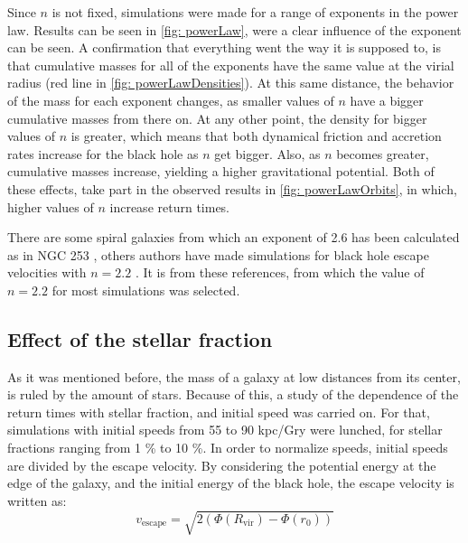 		Since $n$ is not fixed, simulations were made for a range of exponents in the power law. Results can be seen in \autoref{fig: powerLaw}, were a clear influence of the exponent can be seen. A confirmation that everything went the way it is supposed to, is that cumulative masses for all of the exponents have the same value at the virial radius (red line in \autoref{fig: powerLawDensities}). At this same distance, the behavior of the mass for each exponent changes, as smaller values of $n$ have a bigger cumulative masses from there on. At any other point, the density for bigger values of $n$ is greater, which means that both dynamical friction and accretion rates increase for the black hole as $n$ get bigger. Also, as $n$ becomes greater, cumulative masses increase, yielding a higher gravitational potential. Both of these effects, take part in the observed results in \autoref{fig: powerLawOrbits}, in which, higher values of $n$ increase return times.
		
		There are some spiral galaxies from which an exponent of 2.6 has been calculated as in NGC 253 \cite{sorai2000distribution}, others authors have made simulations for black hole escape velocities with $n = 2.2$ \cite{tanaka2009assembly, choksi2017recoiling}. It is from these references, from which the value of $n = 2.2$ for most simulations was selected.
		
	\subsection{Effect of the stellar fraction}
		As it was mentioned before, the mass of a galaxy at low distances from its center, is ruled by the amount of stars. Because of this, a study of the dependence of the return times with stellar fraction, and initial speed was carried on. For that, simulations with initial speeds from 55 to 90 kpc/Gry were lunched, for stellar fractions ranging from 1 \% to 10 \%. In order to normalize speeds, initial speeds are divided by the escape velocity. By considering the potential energy at the edge of the galaxy, and the initial energy of the black hole, the escape velocity is written as:
		\begin{equation}
			v_\text{escape} = \sqrt{2 \left(\Phi(R_\text{vir}) - \Phi(r_0)\right)}
		\end{equation}
		
